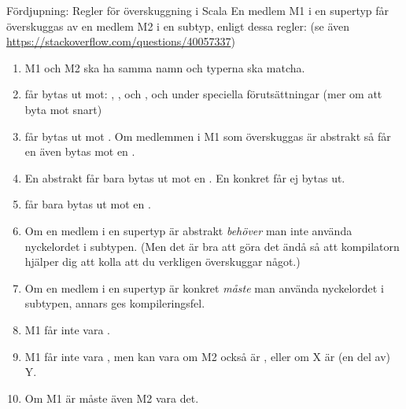 \begin{Slide}{Fördjupning: Regler för överskuggning i Scala} \SlideFontTiny
\label{slideW07:overriderules}
En medlem M1 i en supertyp får överskuggas av en medlem M2 i en subtyp, enligt dessa regler: (se även \url{https://stackoverflow.com/questions/40057337})
\begin{enumerate}
\item M1 och M2 ska ha samma namn och typerna ska matcha.
\item {} får bytas ut mot: , , och , och under speciella förutsättningar  (mer om att byta  mot  snart)
\item {} får bytas ut mot . Om medlemmen i M1 som överskuggas är abstrakt så får en  även bytas mot en .
\item En abstrakt  får bara bytas ut mot en . En konkret  får ej bytas ut.
\item {} får bara bytas ut mot en .
\item Om en medlem i en supertyp är abstrakt \emph{behöver} man inte använda nyckelordet  i subtypen. (Men det är bra att göra det ändå så att kompilatorn hjälper dig att kolla att du verkligen överskuggar något.)
\item Om en medlem i en supertyp är konkret \emph{måste} man använda nyckelordet  i subtypen, annars ges kompileringsfel.
\item M1 får inte vara .
\item M1 får inte vara , men kan vara  om M2 också är , eller  om X är (en del av) Y.
\item Om M1 är  måste även M2 vara det.

\end{enumerate}
\end{Slide}

